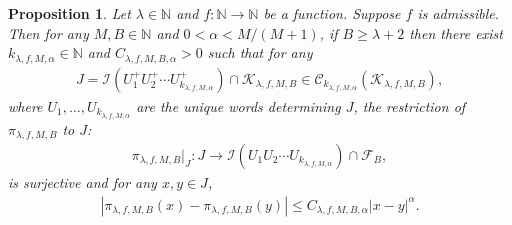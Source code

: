 \documentclass[10pt,a4paper]{amsart}
\newtheorem{prop}{Proposition}
\begin{document}
\begin{prop}
\label{prop:local-holder-final}
Let $\lambda\in\mathbb{N}$ and $f:\mathbb{N}\to\mathbb{N}$ be a function. Suppose $f$ is admissible. Then for any $M,B\in\mathbb{N}$ and $0<\alpha<M/(M+1)$, if $B\geq\lambda+2$ then there exist $k_{\lambda,f,M,\alpha}\in\mathbb{N}$ and $C_{\lambda,f,M,B,\alpha}>0$ such that for any
\begin{align*}
    J
    =\mathcal{I}\!\left(U^+_1U^+_2\cdots U^+_{k_{\lambda,f,M,\alpha}}\right)\cap\mathcal{K}_{\lambda,f,M,B}
    \in\mathscr{C}_{k_{\lambda,f,M,\alpha}}(\mathcal{K}_{\lambda,f,M,B}),
\end{align*}
where \(U_1,\ldots,U_{k_{\lambda,f,M,\alpha}}\) are the unique words determining \(J\), the restriction of $\pi_{\lambda,f,M,B}$ to $J$:
\begin{align*}
    \pi_{\lambda,f,M,B}|_J:J\to \mathcal{I}\!\left(U_1U_2\cdots U_{k_{\lambda,f,M,\alpha}}\right)\cap\mathcal{F}_B,
\end{align*}
is surjective and
for any $x,y\in J$,
\begin{align*}
    \left|\pi_{\lambda,f,M,B}(x)-\pi_{\lambda,f,M,B}(y)\right|
    \leq C_{\lambda,f,M,B,\alpha} \left|x-y\right|^\alpha.
\end{align*}
\end{prop}
\end{document}
